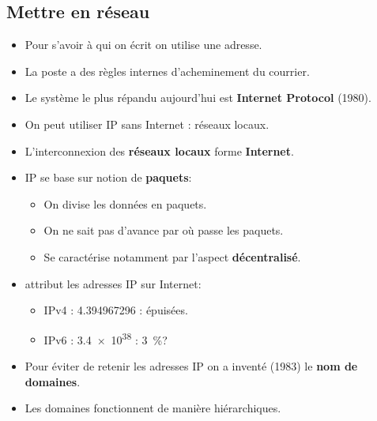 \subsection{Mettre en réseau}
\begin{frame}
	\begin{itemize}
		\item Pour s'avoir à qui on écrit on utilise une adresse.
		\item La poste a des règles internes d'acheminement du courrier.
		\item Le système le plus répandu aujourd'hui est \textbf{Internet Protocol} (1980).
	\end{itemize}
\end{frame}

\begin{frame}
	\begin{itemize}
		\item On peut utiliser IP sans Internet : réseaux locaux.
		\item L'interconnexion des \textbf{réseaux locaux} forme \textbf{Internet}.
		\item IP se base sur notion de \textbf{paquets}:
			\begin{itemize}
				\item On divise les données en paquets.
				\item On ne sait pas d'avance par où passe les paquets.
				\item Se caractérise notamment par l'aspect \textbf{décentralisé}.
			\end{itemize}
		\item {} attribut les adresses IP sur Internet:
			\begin{itemize}
				\item IPv4 : \num{4,3 94 967 296} : épuisées.
				\item IPv6 : \num{3,4e38} : \SI{3}{\percent}?
			\end{itemize}
	\end{itemize}

\end{frame}

\begin{frame}
	\begin{itemize}
		\item Pour éviter de retenir les adresses IP on a inventé (1983) le \textbf{nom de domaines}.
		\item Les domaines fonctionnent de manière hiérarchiques.
	\end{itemize}
\end{frame}

